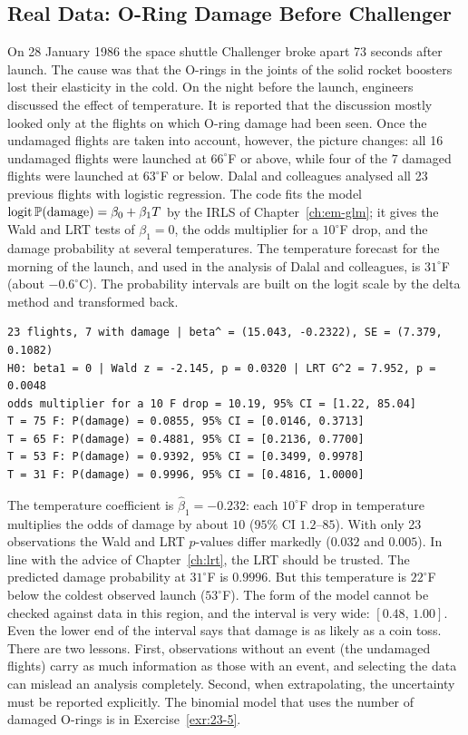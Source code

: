 \documentclass[main.tex]{subfiles}
\begin{document}
\subsection{Real Data: O-Ring Damage Before Challenger}\label{sec:challenger}
On 28 January 1986 the space shuttle Challenger broke apart 73 seconds after launch. The cause was that the O-rings in the joints of the solid rocket boosters lost their elasticity in the cold. On the night before the launch, engineers discussed the effect of temperature. It is reported that the discussion mostly looked only at the flights on which O-ring damage had been seen. Once the undamaged flights are taken into account, however, the picture changes: all 16 undamaged flights were launched at $66^\circ$F or above, while four of the 7 damaged flights were launched at $63^\circ$F or below. Dalal and colleagues \cite{dalal89} analysed all 23 previous flights with logistic regression. The code fits the model $\operatorname{logit}\P(\text{damage})=\beta_0+\beta_1T$ by the IRLS of Chapter~\ref{ch:em-glm}; it gives the Wald and LRT tests of $\beta_1=0$, the odds multiplier for a $10^\circ$F drop, and the damage probability at several temperatures. The temperature forecast for the morning of the launch, and used in the analysis of Dalal and colleagues, is $31^\circ$F (about $-0.6^\circ$C). The probability intervals are built on the logit scale by the delta method and transformed back.

\begin{lstlisting}[style=output]
23 flights, 7 with damage | beta^ = (15.043, -0.2322), SE = (7.379, 0.1082)
H0: beta1 = 0 | Wald z = -2.145, p = 0.0320 | LRT G^2 = 7.952, p = 0.0048
odds multiplier for a 10 F drop = 10.19, 95% CI = [1.22, 85.04]
T = 75 F: P(damage) = 0.0855, 95% CI = [0.0146, 0.3713]
T = 65 F: P(damage) = 0.4881, 95% CI = [0.2136, 0.7700]
T = 53 F: P(damage) = 0.9392, 95% CI = [0.3499, 0.9978]
T = 31 F: P(damage) = 0.9996, 95% CI = [0.4816, 1.0000]
\end{lstlisting}

The temperature coefficient is $\hat\beta_1=-0.232$: each $10^\circ$F drop in temperature multiplies the odds of damage by about $10$ ($95\%$ CI $1.2$--$85$). With only 23 observations the Wald and LRT $p$-values differ markedly ($0.032$ and $0.005$). In line with the advice of Chapter~\ref{ch:lrt}, the LRT should be trusted. The predicted damage probability at $31^\circ$F is $0.9996$. But this temperature is $22^\circ$F below the coldest observed launch ($53^\circ$F). The form of the model cannot be checked against data in this region, and the interval is very wide: $[0.48,\,1.00]$. Even the lower end of the interval says that damage is as likely as a coin toss. There are two lessons. First, observations without an event (the undamaged flights) carry as much information as those with an event, and selecting the data can mislead an analysis completely. Second, when extrapolating, the uncertainty must be reported explicitly. The binomial model that uses the number of damaged O-rings is in Exercise~\ref{exr:23-5}.
\end{document}
